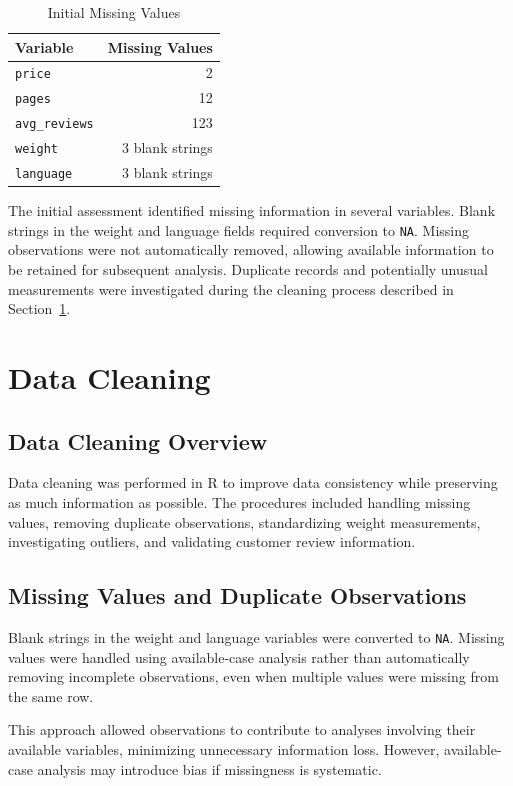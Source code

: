 \documentclass[11pt,a4paper]{article}
\begin{document}
\begin{table}[H]
\centering
\begin{tabular}{lr}
\toprule
Variable & Missing Values \\
\midrule
\texttt{price} & 2 \\
\texttt{pages} & 12 \\
\texttt{avg\_reviews} & 123 \\
\texttt{weight} & 3 blank strings \\
\texttt{language} & 3 blank strings \\
\bottomrule
\end{tabular}
\caption{Initial Missing Values}
\label{tab:missing}
\end{table}
The initial assessment identified missing information
in several variables. Blank strings in the weight and
language fields required conversion to \texttt{NA}.
Missing observations were not automatically removed,
allowing available information to be retained for
subsequent analysis. Duplicate records and potentially
unusual measurements were investigated during the
cleaning process described in Section~\ref{sec:cleaning}.
\endgroup
\section{Data Cleaning}
\label{sec:cleaning}
\subsection{Data Cleaning Overview}

Data cleaning was performed in R to improve data consistency while preserving as much information as possible. The procedures included handling missing values, removing duplicate observations,
standardizing weight measurements, investigating outliers,
and validating customer review information.


\subsection{Missing Values and Duplicate Observations}

Blank strings in the weight and language variables were converted to \texttt{NA}. Missing values were handled using available-case analysis rather than automatically removing incomplete observations, even when multiple values were missing from the same row.

This approach allowed observations to contribute to
analyses involving their available variables, minimizing
unnecessary information loss. However, available-case
analysis may introduce bias if missingness is systematic.
\end{document}
